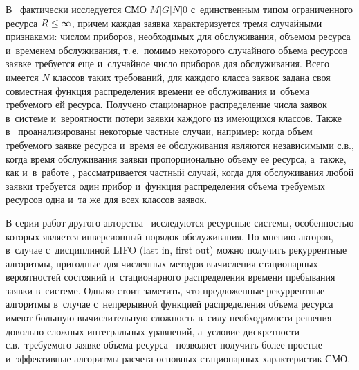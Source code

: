 \begin{multicols}{2}
В~\cite{Tihonenko_26_2005} фактически исследуется СМО $M|G|N|0$ с~единственным 
типом ограниченного ресурса $R\hm\leq \infty$, причем каждая заявка характеризуется 
тремя случайными признаками: числом приборов, необходимых для обслуживания, 
объемом ресурса и~временем обслуживания, т.\,е.\ помимо некоторого случайного 
объема ресурсов заявке требуется еще и~случайное число приборов для 
обслуживания. Всего имеется $N$ классов таких требований, для каждого класса 
заявок задана своя совместная функция распределения времени ее обслуживания 
и~объема требуемого ей ресурса. Получено стационарное распределение числа заявок 
в~сис\-те\-ме и~вероятности потери заявки каждого из име\-ющих\-ся классов. Также 
в~\cite{Tihonenko_26_2005} проанализированы некоторые частные случаи, например: 
когда объем требуемого заявке ресурса и~время ее обслуживания являются 
независимыми с.в., когда время обслуживания заявки пропорционально объему ее 
ресурса, а~также, как и~в~работе \cite{Romm_21_1971}, рассматривается частный 
случай, когда для обслуживания любой заявки требуется один прибор и~функция 
распределения объема требуемых ресурсов одна и~та же для всех классов заявок.

В серии работ другого авторства~\cite{Pechinkin_28_2011,Pechinkin_29_2012,Pechinkin_30_1998,Pechinkin_31_1999} 
исследуются ресурсные сис\-те\-мы, особенностью которых является инверсионный 
порядок обслуживания.
По мнению авторов, в~случае с~дисциплиной LIFO (last in, first out)
можно получить рекуррентные 
алгоритмы, пригодные для численных методов вычисления стационарных вероятностей 
состояний и~стационарного распределения времени пребывания заявки в~сис\-те\-ме. 
Однако стоит заметить, что предложенные рекуррентные алгоритмы в~случае 
с~непрерывной функцией распределения объема ресурса~\cite{Pechinkin_30_1998,Pechinkin_31_1999} имеют большую вычислительную 
сложность в~силу необходимости решения довольно сложных интегральных уравнений, 
а~условие дискретности с.в.\ требуемого заявке объема ресурса~\cite{Pechinkin_28_2011,Pechinkin_29_2012} 
позволяет получить более прос\-тые и~эффективные алгоритмы расчета 
основных стационарных характеристик СМО.


\end{multicols}
